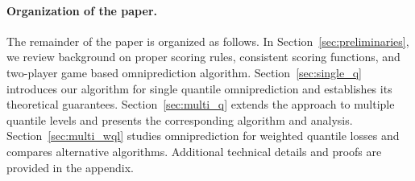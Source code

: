 \paragraph{Organization of the paper.}
The remainder of the paper is organized as follows. In Section~\ref{sec:preliminaries}, we review background on proper scoring rules, consistent scoring functions, and two-player game based omniprediction algorithm. Section~\ref{sec:single_q} introduces our algorithm for single quantile omniprediction and establishes its theoretical guarantees. Section~\ref{sec:multi_q} extends the approach to multiple quantile levels and presents the corresponding algorithm and analysis. Section~\ref{sec:multi_wql} studies omniprediction for weighted quantile losses and compares alternative algorithms. Additional technical details and proofs are provided in the appendix.